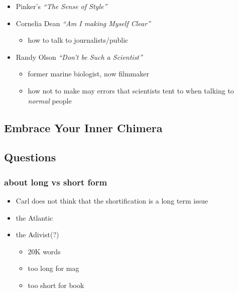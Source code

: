 \documentclass[letterpaper]{scrartcl}
\begin{document}
\begin{itemize}
\itemsep1pt\parskip0pt
\item
  Pinker's \emph{``The Sense of Style''}
\item
  Cornelia Dean \emph{``Am I making Myself Clear''}

  \begin{itemize}
  \itemsep1pt\parskip0pt
  \item
    how to talk to journalists/public
  \end{itemize}
\item
  Randy Olson \emph{``Don't be Such a Scientist''}

  \begin{itemize}
  \itemsep1pt\parskip0pt
  \item
    former marine biologist, now filmmaker
  \item
    how not to make may errors that scientists tent to when talking to
    \emph{normal} people
  \end{itemize}
\end{itemize}

\subsection{Embrace Your Inner
Chimera}\label{embrace-your-inner-chimera}

\subsection{Questions}\label{questions}

\subsubsection{about long vs short form}\label{about-long-vs-short-form}

\begin{itemize}
\itemsep1pt\parskip0pt
\item
  Carl does not think that the shortification is a long term issue
\item
  the Atlantic
\item
  the Adivist(?)

  \begin{itemize}
  \itemsep1pt\parskip0pt
  \item
    20K words
  \item
    too long for mag
  \item
    too short for book
  \end{itemize}
\end{itemize}
\end{document}

